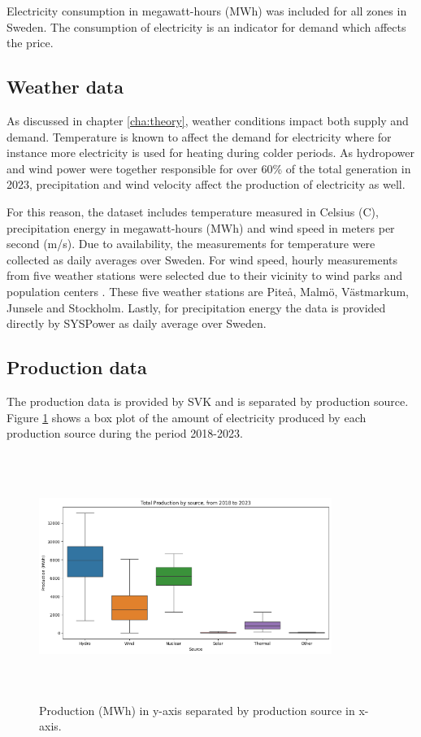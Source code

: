 Electricity consumption in megawatt-hours (MWh) was included for all zones in Sweden. The consumption of electricity is an indicator for demand which affects the price. 

\subsection{Weather data}
As discussed in chapter \ref{cha:theory}, weather conditions impact both supply and demand. Temperature is known to affect the demand for electricity where for instance more electricity is used for heating during colder periods. As hydropower and wind power were together responsible for over 60\% of the total generation in 2023, precipitation and wind velocity affect the production of electricity as well. 

For this reason, the dataset includes temperature measured in Celsius (C), precipitation energy in megawatt-hours (MWh) and wind speed in meters per second (m/s). Due to availability, the measurements for temperature were collected as daily averages over Sweden. For wind speed, hourly measurements from five weather stations were selected due to their vicinity to wind parks and population centers \cite{windstats}. These five weather stations are Piteå, Malmö, Västmarkum, Junsele and Stockholm. Lastly, for precipitation energy the data is provided directly by SYSPower as daily average over Sweden. 

\subsection{Production data}
The production data is provided by SVK and is separated by production source. Figure \ref{fig:prodbytype} shows a box plot of the amount of electricity produced by each production source during the period 2018-2023.

\begin{figure}[H]
    \centering
    \includegraphics[height=8cm, width=0.85\textwidth]{figures/production_by_type.png}
    \caption{Production (MWh) in y-axis separated by production source in x-axis.} 
    \label{fig:prodbytype}
\end{figure}

